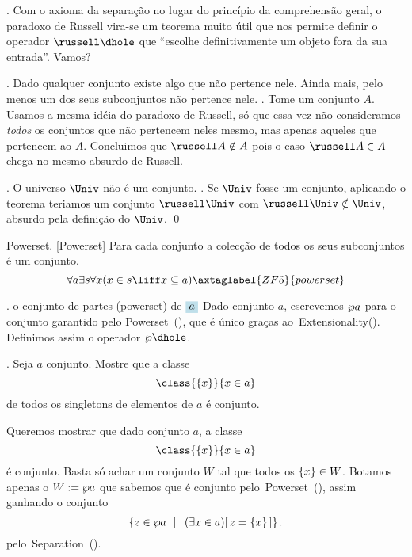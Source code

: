 \endexercise

\blah.
Com o axioma da separação no lugar do princípio da comprehensão geral,
o paradoxo de \Russell{}Russell
vira-se um teorema muito útil que nos permite definir o operador
$\russell\dhole$ que
``escolhe definitivamente um objeto fora da sua entrada''.
Vamos?

\theorem.
\label{russells_paradox_to_theorem}%
Dado qualquer conjunto existe algo que não pertence nele.
Ainda mais, pelo menos um dos seus subconjuntos não pertence nele.
\sketch.
Tome um conjunto $A$.
Usamos a mesma idéia do paradoxo de Russell,
só que essa vez não consideramos \emph{todos} os conjuntos que não
pertencem neles mesmo, mas apenas aqueles que pertencem ao $A$.
Concluimos que $\russell A \notin A$ pois o caso $\russell A \in A$ chega 
no mesmo absurdo de Russell.
\qes

\corollary.
\label{Univ_is_not_a_set}%
O universo $\Univ$ não é um conjunto.
\proof.
Se $\Univ$ fosse um conjunto, aplicando o teorema teriamos um conjunto $\russell \Univ$
com $\russell\Univ \notin \Univ$, absurdo pela definição do $\Univ$.
\qed

\axiom Powerset.
[Powerset]%
\label{powerset}%
Para cada conjunto a colecção de todos os seus subconjuntos é um conjunto.
$$
\forall a
\exists s
\forall x
\paren{
x\in s
\liff
x \subseteq a
}
\axtaglabel{ZF5}{powerset}
$$

.
%
 {o conjunto de partes (powerset) de $\holed a$}%
%
%
Dado conjunto $a$, escrevemos
${\wp}a$
para o conjunto garantido pelo Powerset~(),
que é único graças ao~Extensionality().
Definimos assim o operador $\pset\dhole$.

\exercise.
\label{powersingleton}%
Seja $a$ conjunto.  Mostre que a classe
$$
\class { \set x } { x \in a }
$$
de todos os singletons de elementos de $a$ é conjunto.

\solution
Queremos mostrar que dado conjunto $a$, a classe
$$
\class { \set x } { x \in a }
$$
é conjunto.
Basta só achar um conjunto $W$ tal que todos os $\left\{x\right\} \in W$.
Botamos apenas o $W\mathrel{:=}{\wp}a$ que sabemos que é conjunto
pelo~Powerset~(), assim ganhando o conjunto
$$
\left\{ z\in {\wp}a  \ \;\mathord{\pmb{\mid}}\;\  \left(\/\exists x \in a\right)\!\left[\thinspace z = \left\{x\right\}\thinspace\right] \right\}.
$$
pelo~Separation~().

